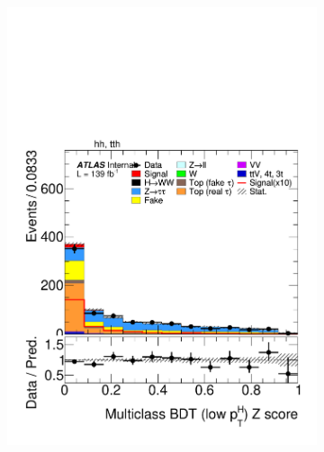 \begin{figure}[!htbp]
  \begin{subfigure}[b]{0.495\textwidth}
    \centering
    \includegraphics[width=\linewidth]{images/plots_overtrain_lt200/plot_tth_Z_multiclass_lt200_hh_tth.pdf}


\end{subfigure}
\end{figure}

